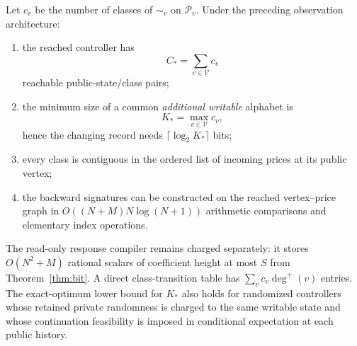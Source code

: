 \begin{theorem}\label{thm:minimal}
Let $c_v$ be the number of classes of $\sim_v$ on $\mathcal P_v$. Under the preceding observation architecture:

\begin{enumerate}
\item the reached controller has
\begin{equation}\label{eq:combined-states}
 C_*=\sum_{v\in\mathcal V}c_v
\end{equation}
reachable public-state/class pairs;
\item the minimum size of a common \emph{additional writable} alphabet is
\begin{equation}\label{eq:minimal-alphabet}
 K_*=\max_{v\in\mathcal V}c_v,
\end{equation}
hence the changing record needs $\lceil\log_2K_*\rceil$ bits;
\item every class is contiguous in the ordered list of incoming prices at its public vertex;
\item the backward signatures can be constructed on the reached vertex--price graph in $O((N+M)N\log(N+1))$ arithmetic comparisons and elementary index operations.
\end{enumerate}
The read-only response compiler remains charged separately: it stores $O(N^2+M)$ rational scalars of coefficient height at most $S$ from Theorem~\ref{thm:bit}. A direct class-transition table has $\sum_v c_v\deg^+(v)$ entries. The exact-optimum lower bound for $K_*$ also holds for randomized controllers whose retained private randomness is charged to the same writable state and whose continuation feasibility is imposed in conditional expectation at each public history.
\end{theorem}

